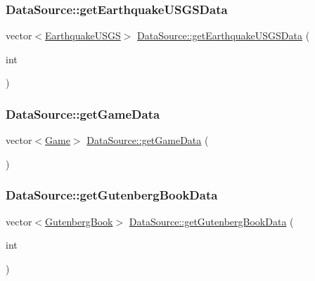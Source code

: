 \subsubsection{\texorpdfstring{Data\+Source\+::get\+Earthquake\+U\+S\+G\+S\+Data}{DataSource::getEarthquakeUSGSData}}
{\footnotesize\ttfamily vector$<$\mbox{\hyperlink{classbridges_1_1_earthquake_u_s_g_s}{Earthquake\+U\+S\+GS}}$>$ \mbox{\hyperlink{namespacebridges_1_1_data_source_ae9f6a40dae8b8a15ebe43aca34931b43}{Data\+Source\+::get\+Earthquake\+U\+S\+G\+S\+Data}} (\begin{DoxyParamCaption}\item[{int}]{ }\end{DoxyParamCaption})\hspace{0.3cm}{\ttfamily [friend]}}

\mbox{\label{classbridges_1_1_server_comm_aaf9715981dcd976f93624bd3aa22183f}} 
\subsubsection{\texorpdfstring{Data\+Source\+::get\+Game\+Data}{DataSource::getGameData}}
{\footnotesize\ttfamily vector$<$\mbox{\hyperlink{classbridges_1_1_game}{Game}}$>$ \mbox{\hyperlink{namespacebridges_1_1_data_source_a96a28cc7f2a6013fe09b07cc53c7432f}{Data\+Source\+::get\+Game\+Data}} (\begin{DoxyParamCaption}{ }\end{DoxyParamCaption})\hspace{0.3cm}{\ttfamily [friend]}}

\mbox{\label{classbridges_1_1_server_comm_a8daad6bf2db8bf4f0b0f9914022b6aa4}} 
\subsubsection{\texorpdfstring{Data\+Source\+::get\+Gutenberg\+Book\+Data}{DataSource::getGutenbergBookData}}
{\footnotesize\ttfamily vector$<$\mbox{\hyperlink{classbridges_1_1_gutenberg_book}{Gutenberg\+Book}}$>$ \mbox{\hyperlink{namespacebridges_1_1_data_source_a8146b00565286727e8206e377d9ff5bd}{Data\+Source\+::get\+Gutenberg\+Book\+Data}} (\begin{DoxyParamCaption}\item[{int}]{ }\end{DoxyParamCaption})\hspace{0.3cm}{\ttfamily [friend]}}

